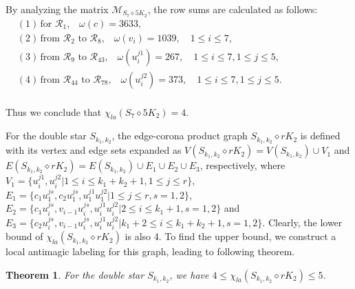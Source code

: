 \documentclass[12pt]{article}
\newtheorem{theorem}{Theorem}[section]
\begin{document}
By analyzing the matrix $\boldsymbol{\mathcal{M}}_{S_{7}\diamond 5K_{2}}$, the row sums are calculated as follows:
\vspace{-1em}
\begin{align*}
&(1)\,\text{for $\mathcal{R}_{1}$,}\quad \omega(c)=3633,\\[-4pt]
&(2)\,\text{from $\mathcal{R}_{2}$ to $\mathcal{R}_{8}$,} \quad\omega(v_{i})=1039,\quad 1\leq i\leq 7,\quad\\[-4pt]
&(3)\,\text{from $\mathcal{R}_{9}$ to $\mathcal{R}_{43}$,}\quad\omega(u_{i}^{j1})=267,\quad1\leq i\leq 7,1\leq j\leq 5,\quad\\[-4pt]
&(4)\,\text{from $\mathcal{R}_{44}$ to $\mathcal{R}_{78}$,} \quad\omega(u_{i}^{j2})=373,\quad 1\leq i\leq 7,1\leq j\leq 5.\hspace{8em}
\end{align*}\\[-35pt]
Thus we conclude that $\chi_{la}(S_{7}\diamond 5K_{2})=4$.

For the double star $S_{k_{1},k_{2}}$, the edge-corona product graph $S_{k_{1},k_{2}}\diamond rK_{2}$ is defined with its vertex and edge sets expanded as
 $V(S_{k_{1},k_{2}}\diamond rK_{2})=V(S_{k_{1},k_{2}})\cup V_{1}$ and $E(S_{k_{1},k_{2}}\diamond rK_{2})=E(S_{k_{1},k_{2}})\cup E_{1}\cup E_{2} \cup E_{3}$, respectively,
where $V_{1}=\{u_{i}^{j1},u_{i}^{j2}|1\leq i\leq k_{1}+k_{2}+1,1\leq j\leq r\}$, $E_{1}=\{c_{1}u_{1}^{js},c_{2}u_{1}^{js},u_{1}^{j1}u_{1}^{j2}|1\leq j\leq r,s=1,2\}$, $E_{2}=\{c_{1}u_{i}^{js},v_{i-1}u_{i}^{js},u_{i}^{j1}u_{i}^{j2}|2\leq i\leq k_{1}+1,s=1,2\}$ and $E_{3}=\{c_{2}u_{i}^{js},v_{i-1}u_{i}^{js},u_{i}^{j1}u_{i}^{j2}|k_{1}+2\leq i\leq k_{1}+k_{2}+1,s=1,2\}$.
Clearly, the lower bound of $\chi_{la}(S_{k_{1},k_{2}}\diamond rK_{2})$ is also 4. To find the upper bound, we construct a local antimagic labeling for this graph, leading to following theorem.
\begin{theorem}
For the double star $S_{k_{1},k_{2}}$, we have $4\leq \chi_{la}(S_{k_{1},k_{2}}\diamond rK_{2})\leq 5$.
\end{theorem}
\end{document}
